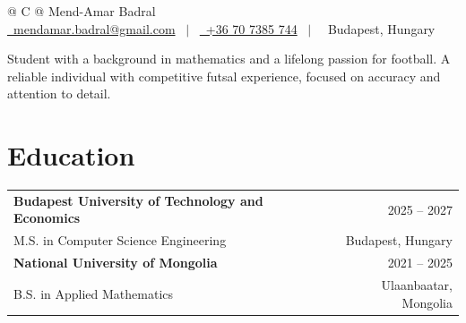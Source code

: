 \documentclass[a4paper,12pt]{article}
\begin{document}
\pagestyle{empty} 

\begin{tabularx}{\linewidth}{@{} C @{}}
\Huge{Mend-Amar Badral} \\[7.5pt]
\href{mailto:mendamar.badral@gmail.com}{\faEnvelope \ mendamar.badral@gmail.com} \ $|$ \ 
\href{tel:+36 707385744}{\faMobile \ +36 70 7385 744} \ $|$ \
\faMapMarker \ Budapest, Hungary 
\end{tabularx}

\vspace{1em}
\noindent
Student with a background in mathematics and a lifelong passion for football. A reliable individual with competitive futsal experience, focused on accuracy and attention to detail.

\section{Education}

\begin{tabularx}{\linewidth}{@{}l X r@{}}
\textbf{Budapest University of Technology and Economics} & & 2025 -- 2027\\
M.S. in Computer Science Engineering & & Budapest, Hungary \\

\textbf{National University of Mongolia} & & 2021 -- 2025 \\
B.S. in Applied Mathematics & & Ulaanbaatar, Mongolia \\
\end{tabularx}

\end{document}
